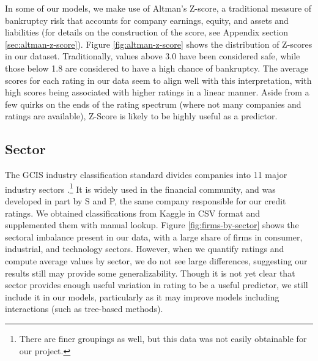 \documentclass{article}[11pt]
\begin{document}
    In some of our models, we make use of Altman's Z-score, a traditional measure of bankruptcy risk that accounts for company earnings, equity, and assets and liabilities \citep{altman_financial_1968} (for details on the construction of the score, see Appendix section \ref{sec:altman-z-score}). Figure \ref{fig:altman-z-score} shows the distribution of Z-scores in our dataset. Traditionally, values above 3.0 have been considered safe, while those below 1.8 are considered to have a high chance of bankruptcy. The average scores for each rating in our data seem to align well with this interpretation, with high scores being associated with higher ratings in a linear manner. Aside from a few quirks on the ends of the rating spectrum (where not many companies and ratings are available), Z-Score is likely to be highly useful as a predictor.
      
    \subsection*{Sector}

    The GCIS industry classification standard divides companies into 11 major industry sectors \citep{s_and_p_gics_2024}.\footnote{There are finer groupings as well, but this data was not easily obtainable for our project.} It is widely used in the financial community, and was developed in part by S and P, the same company responsible for our credit ratings. We obtained classifications from Kaggle in CSV format \citep{kozlov_us_2022} and supplemented them with manual lookup. Figure \ref{fig:firms-by-sector} shows the sectoral imbalance present in our data, with a large share of firms in consumer, industrial, and technology sectors. However, when we quantify ratings and compute average values by sector, we do not see large differences, suggesting our results still may provide some generalizability. Though it is not yet clear that sector provides enough useful variation in rating to be a useful predictor, we still include it in our models, particularly as it may improve models including interactions (such as tree-based methods).
\end{document}
